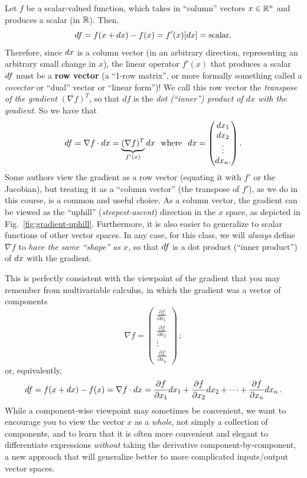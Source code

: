 Let $f$ be a scalar-valued function, which takes in ``column'' vectors $x \in \mathbb R^n$ and produces a scalar (in $\mathbb R$). Then,
\[
d f = f(x+ d x) - f(x) = f'(x) [d x] = \text{scalar}.
\]
Therefore, since $d x$ is a column vector (in an arbitrary direction, representing an arbitrary small change in $x$), the linear operator $f'(x)$ that produces a scalar $d f$ must be a \textbf{row vector} (a ``1-row matrix'', or more formally something called a \emph{covector} or ``dual'' vector or ``linear form'')! We call this row vector the \emph{transpose of the gradient} $(\nabla f)^T$, so that $df$ is the \emph{dot (``inner'') product of $dx$ with the gradient}. So we have that
\[
d f = \nabla f \cdot d x = \underbrace{(\nabla f)^T}_{f'(x)} d x \hspace{.25cm} \text{where} \hspace{.25cm} d x = \begin{pmatrix}
d x_1 \\  d x_2 \\ \vdots \\ d x_n.
\end{pmatrix} .
\]
Some authors view the gradient as a row vector (equating it with $f'$ or the Jacobian), but treating it as a ``column vector'' (the transpose of $f'$), as we do in this course, is a common and useful choice. As a column vector, the gradient can be viewed as the ``uphill'' (\emph{steepest-ascent}) direction in the $x$ space, as depicted in Fig.~\ref{fig:gradient-uphill}.  Furthermore, it is also easier to generalize to scalar functions of other vector spaces. In any case, for this class, we will \textit{always} define $\nabla f$ to \emph{have the same ``shape'' as $x$}, so that $d f$ is a dot product (``inner product'') of $d x$ with the gradient.

This is perfectly consistent with the viewpoint of the gradient that you may remember from multivariable calculus, in which the gradient was a vector of components
$$
\nabla f = \begin{pmatrix}
\frac{\partial f}{\partial x_1} \\  \frac{\partial f}{\partial x_2} \\ \vdots \\ \frac{\partial f}{\partial x_n}
\end{pmatrix} \, ;
$$
or, equivalently,
$$
d f = f(x+d x)-f(x) = \nabla f \cdot dx = \frac{\partial f}{\partial x_1} dx_1 + \frac{\partial f}{\partial x_2} dx_2 + \cdots + \frac{\partial f}{\partial x_n} dx_n \, .
$$
While a component-wise viewpoint may sometimes be convenient, we want to encourage you to view the vector $x$ as a \emph{whole}, not simply a collection of components, and to learn that it is often more convenient and elegant to differentiate expressions \emph{without} taking the derivative component-by-component, a new approach that will generalize better to more complicated inputs/output vector spaces.

